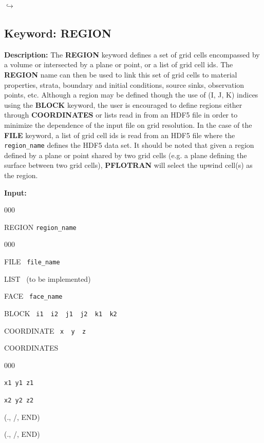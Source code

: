 \documentclass[12pt]{article}
\newcommand\return{{\hfill$\hookrightarrow$}}
\begin{document}
\hyperlink{target_key}{\return}


\newpage
\protect\hypertarget{target_region}{}


\subsection{Keyword: REGION}

{\noindent\bf Description:}
The {\bf REGION} keyword defines a set of grid cells encompassed by a volume or intersected by a plane or point, or a list of grid cell ids.  The {\bf REGION} name can then be used to link this set of grid cells to material properties, strata, boundary and initial conditions, source sinks, observation points, etc.  Although a region may be defined though the use of (I, J, K) indices using the {\bf BLOCK} keyword, the user is encouraged to define regions either through {\bf COORDINATES} or lists read in from an HDF5 file in order to minimize the dependence of the input file on grid resolution.  In the case of the {\bf FILE} keyword, a list of grid cell ids is read from an HDF5 file where the {\tt region\_name} defines the HDF5 data set.  It should be noted that given a region defined by a plane or point shared by two grid cells (e.g. a plane defining the surface between two grid cells), {\bf PFLOTRAN} will select the upwind cell(s) as the region.

{\noindent\bf Input:}

\begin{deflist}{000}
\item[REGION] {\tt region\_name}
\begin{deflist}{000}
\item[FILE] \ {\tt file\_name}
\item[LIST] \ (to be implemented)
\item[FACE] \ {\tt face\_name}
\item[BLOCK] \ {\tt i1 \ i2 \ j1 \ j2 \ k1 \ k2}
\item[COORDINATE] \ {\tt x \ y \ z}
\item[COORDINATES] ~
\begin{deflist}{000}
\item[\tt x1 y1 z1]
\item[\tt x2 y2 z2]
\end{deflist}
\item[(., /, END)]
\end{deflist}
\item[(., /, END)]
\end{deflist}
\end{document}
